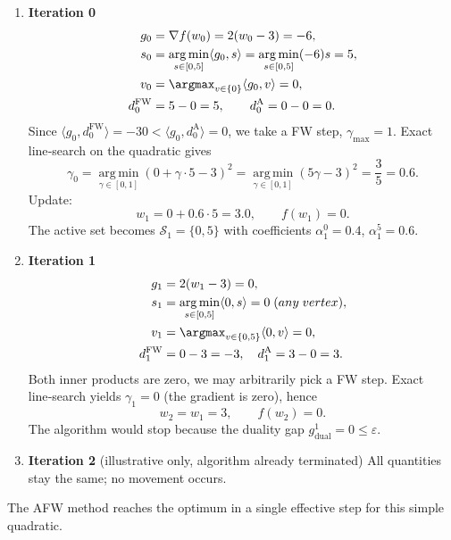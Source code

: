 \documentclass{article}
\newcommand{\argmin}{\operatorname*{arg\,min}}
\begin{document}
\begin{enumerate}[label=\textbf{Iter \arabic*:},leftmargin=*,itemsep=1ex]
\item \textbf{Iteration 0}
\begin{align*}
g_{0}&=\nabla f(w_{0})=2(w_{0}-3)=-6,\\
s_{0}&=\argmin_{s\in[0,5]}\langle g_{0},s\rangle
      =\argmin_{s\in[0,5]} (-6)s =5,\\
v_{0}&=\argmax_{v\in\{0\}}\langle g_{0},v\rangle =0,\\
d^{\text{FW}}_{0}&=5-0=5,\qquad
d^{\text{A}}_{0}=0-0=0.
\end{align*}
Since $\langle g_{0},d^{\text{FW}}_{0}\rangle =-30 < \langle g_{0},d^{\text{A}}_{0}\rangle=0$, we take a FW step,
$\gamma_{\max}=1$. Exact line‑search on the quadratic gives
\[
\gamma_{0}= \argmin_{\gamma\in[0,1]} (0+\gamma\cdot5-3)^{2}
          =\argmin_{\gamma\in[0,1]} (5\gamma-3)^{2}
          =\frac{3}{5}=0.6.
\]
Update:
\[
w_{1}=0+0.6\cdot5=3.0,\qquad f(w_{1})=0.
\]
The active set becomes $\mathcal{S}_{1}=\{0,5\}$ with coefficients
$\alpha_{1}^{0}=0.4$, $\alpha_{1}^{5}=0.6$.

\item \textbf{Iteration 1}
\begin{align*}
g_{1}&=2(w_{1}-3)=0,\\
s_{1}&=\argmin_{s\in[0,5]}\langle 0,s\rangle =0\;(any\;vertex),\\
v_{1}&=\argmax_{v\in\{0,5\}}\langle 0,v\rangle =0,\\
d^{\text{FW}}_{1}&=0-3=-3,\quad d^{\text{A}}_{1}=3-0=3.
\end{align*}
Both inner products are zero, we may arbitrarily pick a FW step.  
Exact line‑search yields $\gamma_{1}=0$ (the gradient is zero), hence
\[
w_{2}=w_{1}=3,\qquad f(w_{2})=0.
\]
The algorithm would stop because the duality gap $g_{\text{dual}}^{1}=0\le\varepsilon$.

\item \textbf{Iteration 2} (illustrative only, algorithm already terminated)
All quantities stay the same; no movement occurs.
\end{enumerate}
The AFW method reaches the optimum in a single effective step for this simple quadratic.

\newpage
\end{document}
